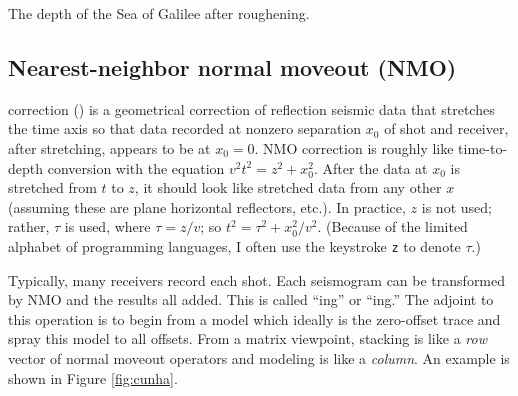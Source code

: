 %
{}

 {
  The depth of the Sea of Galilee after roughening.
}

\subsection{Nearest-neighbor normal moveout (NMO)}
\par
{}
correction () is a geometrical correction
of reflection seismic data
that stretches the time axis so that data recorded
at nonzero separation $x_0$ of shot and receiver,
after stretching, appears to be at $x_0=0$.
NMO correction is roughly like time-to-depth conversion
with the equation $v^2 t^2 = z^2 + x_0^2$.
After the data at $x_0$ is stretched from $t$ to $z$,
it should look like stretched data from any other $x$
(assuming these are plane horizontal reflectors, etc.).
In practice, $z$ is not used; rather,
 $\tau$ is used,
where $\tau =z/v$;
so $t^2 = \tau^2+x_0^2/v^2$.
(Because of the limited alphabet of programming languages,
I often use the keystroke {\tt z} to denote $\tau$.)


\par
Typically, many receivers record each shot.
Each seismogram can be transformed by NMO
and the results all added.
This is called ``ing'' or ``ing.''
The adjoint to this operation is to begin from
a model which ideally is the zero-offset trace
and spray this model to all offsets.
From a matrix viewpoint, stacking is like a {\em  row} vector
of normal moveout operators and modeling is like a {\em  column}.
An example is shown in Figure \ref{fig:cunha}.

